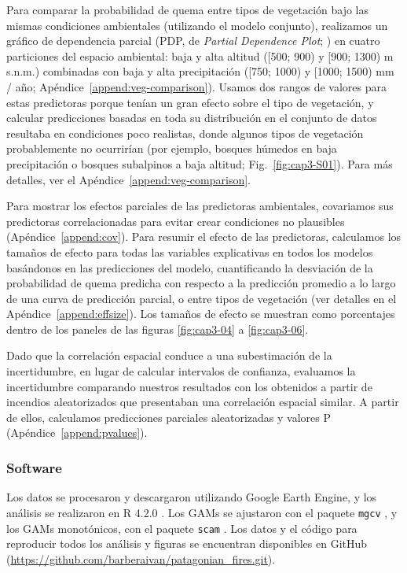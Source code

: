 Para comparar la probabilidad de quema entre tipos de vegetación bajo las mismas condiciones ambientales (utilizando el modelo conjunto), realizamos un gráfico de dependencia parcial (PDP, de \textit{Partial Dependence Plot}; \citealt{greenwell2017pdp}) en cuatro particiones del espacio ambiental: baja y alta altitud ([500; 900) y [900; 1300) m s.n.m.) combinadas con baja y alta precipitación ([750; 1000) y [1000; 1500) mm / año; Apéndice~\ref{append:veg-comparison}). Usamos dos rangos de valores para estas predictoras porque tenían un gran efecto sobre el tipo de vegetación, y calcular predicciones basadas en toda su distribución en el conjunto de datos resultaba en condiciones poco realistas, donde algunos tipos de vegetación probablemente no ocurrirían (por ejemplo, bosques húmedos en baja precipitación o bosques subalpinos a baja altitud; Fig.~\ref{fig:cap3-S01}). Para más detalles, ver el Apéndice~\ref{append:veg-comparison}.

Para mostrar los efectos parciales de las predictoras ambientales, covariamos sus predictoras correlacionadas para evitar crear condiciones no plausibles (Apéndice~\ref{append:cov}). Para resumir el efecto de las predictoras, calculamos los tamaños de efecto para todas las variables explicativas en todos los modelos basándonos en las predicciones del modelo, cuantificando la desviación de la probabilidad de quema predicha con respecto a la predicción promedio a lo largo de una curva de predicción parcial, o entre tipos de vegetación (ver detalles en el Apéndice~\ref{append:effsize}). Los tamaños de efecto se muestran como porcentajes dentro de los paneles de las figuras \ref{fig:cap3-04} a \ref{fig:cap3-06}.

Dado que la correlación espacial conduce a una subestimación de la incertidumbre, en lugar de calcular intervalos de confianza, evaluamos la incertidumbre comparando nuestros resultados con los obtenidos a partir de incendios aleatorizados que presentaban una correlación espacial similar. A partir de ellos, calculamos predicciones parciales aleatorizadas y valores P (Apéndice~\ref{append:pvalues}).

\subsubsection{Software}

Los datos se procesaron y descargaron utilizando Google Earth Engine, y los análisis se realizaron en R 4.2.0 \citep{R}. Los GAMs se ajustaron con el paquete \texttt{mgcv} \citep{wood_generalized_2017}, y los GAMs monotónicos, con el paquete \texttt{scam} \citep{pya_scam_2024}. Los datos y el código para reproducir todos los análisis y figuras se encuentran disponibles en GitHub (\url{https://github.com/barberaivan/patagonian_fires.git}).

